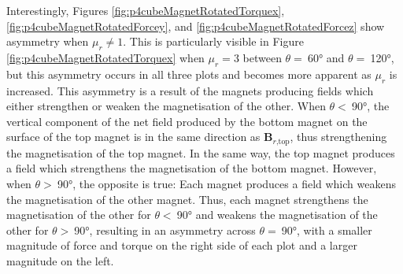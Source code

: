 Interestingly, Figures \ref{fig:p4cubeMagnetRotatedTorquex}, \ref{fig:p4cubeMagnetRotatedForcey}, and \ref{fig:p4cubeMagnetRotatedForcez} show asymmetry when \(\mu_r \neq 1\). This is particularly visible in Figure \ref{fig:p4cubeMagnetRotatedTorquex} when \(\mu_r = 3\) between \(\theta =\ \)\ang{60} and \(\theta =\ \)\ang{120}, but this asymmetry occurs in all three plots and becomes more apparent as \(\mu_r\) is increased. This asymmetry is a result of the magnets producing fields which either strengthen or weaken the magnetisation of the other. When \(\theta <\ \)\ang{90}, the vertical component of the net field produced by the bottom magnet on the surface of the top magnet is in the same direction as \(\mathbf{B}_{r\text{,top}}\), thus strengthening the magnetisation of the top magnet. In the same way, the top magnet produces a field which strengthens the magnetisation of the bottom magnet. However, when \(\theta >\ \)\ang{90}, the opposite is true: Each magnet produces a field which weakens the magnetisation of the other magnet. Thus, each magnet strengthens the magnetisation of the other for \(\theta <\ \)\ang{90} and weakens the magnetisation of the other for \(\theta >\ \)\ang{90}, resulting in an asymmetry across \(\theta =\ \)\ang{90}, with a smaller magnitude of force and torque on the right side of each plot and a larger magnitude on the left.

